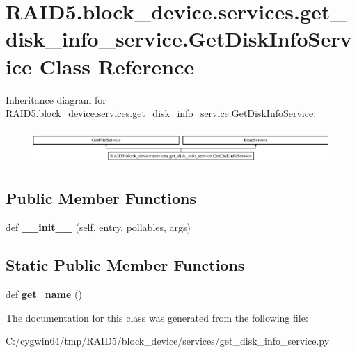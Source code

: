 \hypertarget{class_r_a_i_d5_1_1block__device_1_1services_1_1get__disk__info__service_1_1_get_disk_info_service}{}\section{R\+A\+I\+D5.\+block\+\_\+device.\+services.\+get\+\_\+disk\+\_\+info\+\_\+service.\+Get\+Disk\+Info\+Service Class Reference}
\label{class_r_a_i_d5_1_1block__device_1_1services_1_1get__disk__info__service_1_1_get_disk_info_service}
Inheritance diagram for R\+A\+I\+D5.\+block\+\_\+device.\+services.\+get\+\_\+disk\+\_\+info\+\_\+service.\+Get\+Disk\+Info\+Service\+:\begin{figure}[H]
\begin{center}
\leavevmode
\includegraphics[height=1.314554cm]{class_r_a_i_d5_1_1block__device_1_1services_1_1get__disk__info__service_1_1_get_disk_info_service}
\end{center}
\end{figure}
\subsection*{Public Member Functions}
\begin{DoxyCompactItemize}
\item 
\mbox{\label{class_r_a_i_d5_1_1block__device_1_1services_1_1get__disk__info__service_1_1_get_disk_info_service_a24750dbde71ba0f0c2048e38e64258fa}} 
def {\bfseries \+\_\+\+\_\+init\+\_\+\+\_\+} (self, entry, pollables, args)
\end{DoxyCompactItemize}
\subsection*{Static Public Member Functions}
\begin{DoxyCompactItemize}
\item 
\mbox{\label{class_r_a_i_d5_1_1block__device_1_1services_1_1get__disk__info__service_1_1_get_disk_info_service_acdcf11106f83ada86ec5a72c0eb8b938}} 
def {\bfseries get\+\_\+name} ()
\end{DoxyCompactItemize}


The documentation for this class was generated from the following file\+:\begin{DoxyCompactItemize}
\item 
C\+:/cygwin64/tmp/\+R\+A\+I\+D5/block\+\_\+device/services/get\+\_\+disk\+\_\+info\+\_\+service.\+py\end{DoxyCompactItemize}
